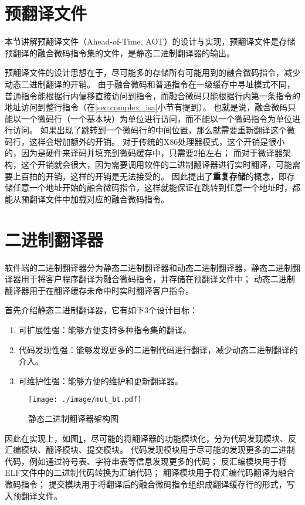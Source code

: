 \section{预翻译文件}\label{sec:aot}

本节讲解预翻译文件（Ahead-of-Time, AOT）的设计与实现，预翻译文件是存储预翻译的融合微码指令集的文件，是静态二进制翻译器的输出。

预翻译文件的设计思想在于，尽可能多的存储所有可能用到的融合微码指令，减少动态二进制翻译的开销。
由于融合微码和普通指令在一级缓存中寻址模式不同，普通指令能根据行内偏移直接访问到指令，而融合微码只能根据行内第一条指令的地址访问到整行指令（在\ref{sec:complex_isa}小节有提到）。
也就是说，融合微码只能以一个微码行（一个基本块）为单位进行访问，而不能以一个微码指令为单位进行访问。
如果出现了跳转到一个微码行的中间位置，那么就需要重新翻译这个微码行，这样会增加额外的开销。
对于传统的X86处理器模式，这个开销是很小的，因为是硬件来译码并填充到微码缓存中，只需要2拍左右；
而对于微译器架构，这个开销就会很大，因为需要调用软件的二进制翻译器进行实时翻译，可能需要上百拍的开销，这样的开销是无法接受的。
因此提出了\textbf{重复存储}的概念，即存储任意一个地址开始的融合微码指令，这样就能保证在跳转到任意一个地址时，都能从预翻译文件中加载对应的融合微码指令。


\section{二进制翻译器}

软件端的二进制翻译器分为静态二进制翻译器和动态二进制翻译器，静态二进制翻译器用于将客户程序翻译为融合微码指令，并存储在预翻译文件中；
动态二进制翻译器用于在翻译缓存未命中时实时翻译客户指令。

首先介绍静态二进制翻译器，它有如下3个设计目标：
\begin{enumerate}
  \item 可扩展性强：能够方便支持多种指令集的翻译。
  \item 代码发现性强：能够发现更多的二进制代码进行翻译，减少动态二进制翻译的介入。
  \item 可维护性强：能够方便的维护和更新翻译器。
\end{enumerate}

\begin{figure}[!htbp]
  \centering
  \texttt{[image: ./image/mut\_bt.pdf]}
  \caption{静态二进制翻译器架构图}
  \label{img:mut_bt}
\end{figure}

因此在实现上，如图\ref{img:mut_bt}，尽可能的将翻译器的功能模块化，分为代码发现模块、反汇编模块、翻译模块、提交模块。
代码发现模块用于尽可能的发现更多的二进制代码，例如通过符号表、字符串表等信息发现更多的代码；
反汇编模块用于将ELF文件中的二进制代码转换为汇编代码；
翻译模块用于将汇编代码翻译为融合微码指令；
提交模块用于将翻译后的融合微码指令组织成翻译缓存行的形式，写入预翻译文件。

